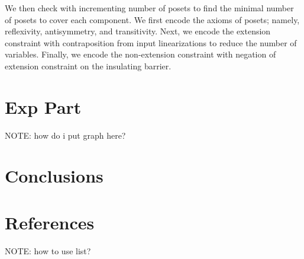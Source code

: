 \documentclass{llncs}
\begin{document}
We then check with incrementing number of posets to find the minimal number of posets to cover each component. We first encode the axioms of posets; namely, reflexivity, antisymmetry, and transitivity. Next, we encode the extension constraint with contraposition from input linearizations to reduce the number of variables. Finally, we encode the non-extension constraint with negation of extension constraint on the insulating barrier.

\section{Exp Part}
NOTE: how do i put graph here?

\section{Conclusions}

\section{References}
NOTE: how to use list?
\end{document}
